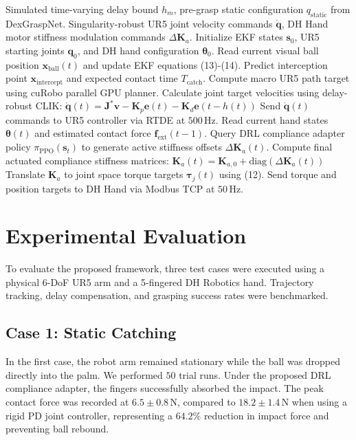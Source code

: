 \documentclass[letterpaper,journal]{IEEEtran}
\begin{document}
\begin{algorithm}[h]
\caption{Digital Twin-Driven Dynamic Catching and Compliance Control}
\label{alg:catching_control}
\begin{algorithmic}[1]
\REQUIRE Simulated time-varying delay bound $h_m$, pre-grasp static configuration $q_{\text{static}}$ from DexGraspNet.
\ENSURE Singularity-robust UR5 joint velocity commands $\dot{\mathbf{q}}$, DH Hand motor stiffness modulation commands $\Delta \mathbf{K}_a$.
\STATE Initialize EKF states $\mathbf{s}_0$, UR5 starting joints $\mathbf{q}_0$, and DH hand configuration $\boldsymbol{\theta}_0$.
    \STATE Read current visual ball position $\mathbf{x}_{\text{ball}}(t)$ and update EKF equations (13)-(14).
    \STATE Predict interception point $\mathbf{x}_{\text{intercept}}$ and expected contact time $T_{\text{catch}}$.
        \STATE Compute macro UR5 path target using cuRobo parallel GPU planner.
        \STATE Calculate joint target velocities using delay-robust CLIK:
        \STATE $\dot{\mathbf{q}}(t) = \mathbf{J}^* \mathbf{v} - \mathbf{K}_p \mathbf{e}(t) - \mathbf{K}_d \mathbf{e}(t - h(t))$
        \STATE Send $\dot{\mathbf{q}}(t)$ commands to UR5 controller via RTDE at $500\,\text{Hz}$.
    \ENDIF
    \STATE Read current hand states $\boldsymbol{\theta}(t)$ and estimated contact force $\mathbf{f}_{\text{ext}}(t-1)$.
    \STATE Query DRL compliance adapter policy $\pi_{\text{PPO}}(\mathbf{s}_t)$ to generate active stiffness offsets $\Delta \mathbf{K}_a(t)$.
    \STATE Compute final actuated compliance stiffness matrices:
    \STATE $\mathbf{K}_a(t) = \mathbf{K}_{a, 0} + \text{diag}(\Delta \mathbf{K}_a(t))$
    \STATE Translate $\mathbf{K}_a$ to joint space torque targets $\boldsymbol{\tau}_j(t)$ using (12).
    \STATE Send torque and position targets to DH Hand via Modbus TCP at $50\,\text{Hz}$.
\ENDWHILE
\end{algorithmic}
\end{algorithm}

\section{Experimental Evaluation}
To evaluate the proposed framework, three test cases were executed using a physical 6-DoF UR5 arm and a 5-fingered DH Robotics hand. Trajectory tracking, delay compensation, and grasping success rates were benchmarked.

\subsection{Case 1: Static Catching}
In the first case, the robot arm remained stationary while the ball was dropped directly into the palm. We performed $50$ trial runs. Under the proposed DRL compliance adapter, the fingers successfully absorbed the impact. The peak contact force was recorded at $6.5 \pm 0.8\,\text{N}$, compared to $18.2 \pm 1.4\,\text{N}$ when using a rigid PD joint controller, representing a $64.2\%$ reduction in impact force and preventing ball rebound.
\end{document}
